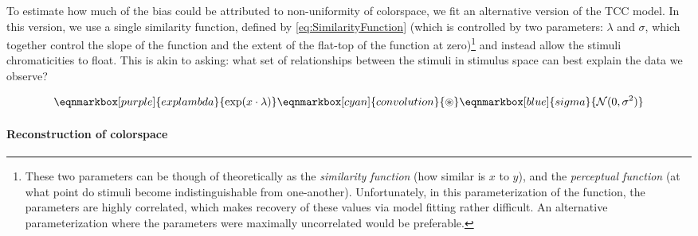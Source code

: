 To estimate how much of the bias could be attributed to non-uniformity of colorspace, we fit an alternative version of the TCC model. 
In this version, we use a single similarity function, defined by \autoref{eq:SimilarityFunction} (which is controlled by two parameters: $\lambda$ and $\sigma$, which together control the slope of the function and the extent of the flat-top of the function at zero)\footnote{These two parameters can be though of theoretically as the \emph{similarity function} (how similar is $x$ to $y$), and the \emph{perceptual function} (at what point do stimuli become indistinguishable from one-another). Unfortunately, in this parameterization of the function, the parameters are highly correlated, which makes recovery of these values via model fitting rather difficult. An alternative parameterization where the parameters were maximally uncorrelated would be preferable.} and instead allow the stimuli chromaticities to float.
This is akin to asking: what set of relationships between the stimuli in stimulus space can best explain the data we observe?

\renewcommand{\eqnhighlightheight}{\vphantom{\hat{H}}\mathstrut} %


\vspace{2em} 
\begin{equation} \label{eq:SimilarityFunction}
    \eqnmarkbox[purple]{explambda}{\exp(x\cdot\lambda)}
    \eqnmarkbox[cyan]{convolution}{\circledast}
    \eqnmarkbox[blue]{sigma}{\mathcal{N}(0,\sigma^2)}
\end{equation}





\vspace{2em} 

\paragraph{Reconstruction of colorspace}

